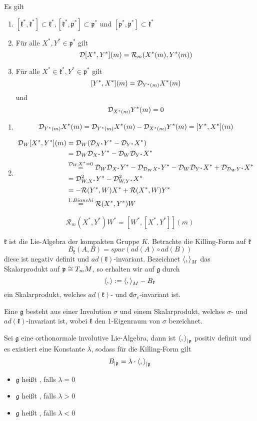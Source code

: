\documentclass{book}
\renewcommand{\d}{\textsf{d}}
\newcommand{\pf}{\mathfrak{p}}
\newcommand{\Rc}{\mathcal{R}}
\newcommand{\g}{\mathfrak{g}}
\newcommand{\kf}{\mathfrak{k}}
\begin{document}
\Prop{}
Es gilt
\begin{enumerate}[1.)]
\item $[\kf^*, \kf^*] \subset \kf^*, [\kf^*, \pf^*] \subset \pf^*$ und $[\pf^*, \pf^*] \subset \kf^*$
\item Für alle $X^*,Y^* \in \pf^*$ gilt
\[ \D [X^*, Y^*](m) = \Rc_m(X^*(m),Y^*(m)) \]
\item Für alle $X^*\in \kf^*, Y^* \in \pf^*$ gilt
\[ [ Y^*, X^* ](m) = \mathcal{D}_{Y^*(m)}X^*(m)  \]
und
\[ \mathcal{D}_{X^*(m)}Y^*(m) = 0 \]
\end{enumerate}
\begin{Beweis}{}
\begin{enumerate}[1.)]
\item \[  \mathcal{D}_{Y^*(m)}X^*(m) = \mathcal{D}_{Y^*(m)}X^*(m) - \mathcal{D}_{X^*(m)}Y^*(m) = [ Y^*, X^* ](m)   \]
\item 
\begin{align*}
\D_W[X^*,Y^*](m) &= \D_W(\D_{X^*}Y^* - \D_{Y^*}X^*)\\
 &= \D_W\D_{X^*}Y^* - \D_W\D_{Y^*}X^*\\
 &\gl{ \D_WX^* = 0 } \D_W\D_{X^*}Y^* - \D_{\D_WX^*}Y^*- \D_W\D_{Y^*}X^* + \D_{\D_WY^*}X^*\\
 &= \D_{W,X^*}^2Y^* - \D_{W,Y^*}^2X^*\\
 &= - \Rc(Y^*,W)X^* + \Rc (X^*,W)Y^*\\
 &\gl{1.Bianchi} \Rc(X^*,Y^*)W
\end{align*}
\end{enumerate}

\end{Beweis}

\Kor{}
\[ \Rc_m(X^*,Y^*)W^* = [W^*,[X^*,Y^*]](m) \]

\Bem{}
$\kf$ ist die Lie-Algebra der kompakten Gruppe $K$. Betrachte die Killing-Form auf $\kf$
\[ B_{\kf} (A,B) = spur(ad(A) \circ ad(B)) \]
diese ist negativ definit und $ad(\kf)$-invariant. Bezeichnet $\left<,\right>_M$ das Skalarprodukt auf $\pf \isom{} T_mM$, so erhalten wir auf $\g$ durch
\[ \shrp{,} := \shrp{,}_M - B_\kf \]
ein Skalarprodukt, welches $ad(\kf)$- und $\d \sigma_e$-invariant ist.

\Def{}
Eine  $\g$ besteht aus einer Involution $\sigma$ und einem Skalarprodukt, welches $\sigma$- und $ad(\kf)$-invariant ist, wobei $\kf$ den 1-Eigenraum von $\sigma$ bezeichnet.

\Def{}
Sei $\g$ eine orthonormale involutive Lie-Algebra, dann ist $\shrp{,}_{|\pf}$ positiv definit und es existiert eine Konstante $\lambda$, sodass für die Killing-Form gilt
\[ B_{|\pf} = \lambda \cdot \shrp{,}_{|\pf} \]
\begin{itemize}
\item $\g$ heißt , falls $\lambda = 0$
\item $\g$ heißt , falls $\lambda > 0$
\item $\g$ heißt , falls $\lambda < 0$
\end{itemize}
\end{document}
